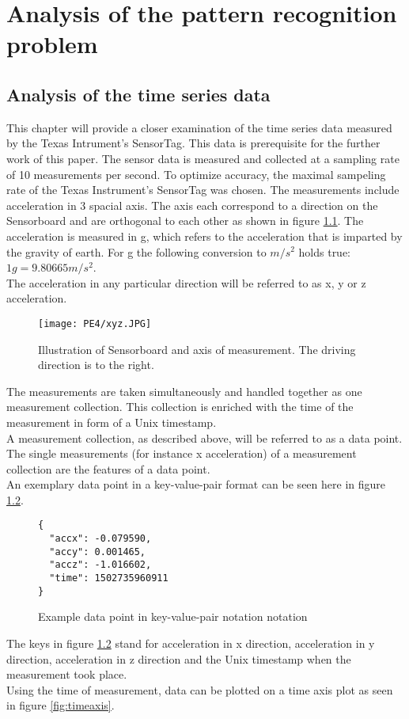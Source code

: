 \chapter{Analysis of the pattern recognition problem}
\label{ch:Analysis of the pattern recognition problem}

\section{Analysis of the time series data}
\label{sec:Analysis of the time series data}
This chapter will provide a closer examination of the time series data measured by the Texas Intrument's SensorTag. This data is prerequisite for the further work of this paper. \newline
The sensor data is measured and collected at a sampling rate of 10 measurements per second. To optimize accuracy, the maximal sampeling rate of the Texas Instrument's SensorTag was chosen.  The measurements include acceleration in 3 spacial axis. The axis each correspond to a direction on the Sensorboard and are orthogonal to each other as shown in figure \ref{fig:xyzboard}. The acceleration is measured in g, which refers to the acceleration that is imparted by the gravity of earth. For g the following conversion to  $m/s^2 $ holds true: $ 1 g = 9.80665 m/s^2 $. 
\\
The acceleration in any particular direction will be referred to as x, y or z acceleration.\cite{techdocu}

\begin{figure}[h]
\centering
\texttt{[image: PE4/xyz.JPG]}
\caption{Illustration of Sensorboard and axis of measurement. The driving direction is to the right.}
\label{fig:xyzboard}
\end{figure}


The measurements are taken  simultaneously and handled together as one measurement collection. This collection is enriched with the time of the measurement  in form of a Unix timestamp.\\
A measurement collection, as described above, will be referred to as a data point. The single measurements (for instance x acceleration) of a measurement collection are the features of a data point.\\
An exemplary data point in a key-value-pair format can be seen here in figure \ref{fig:datapointjson}.
\begin{figure}[h]
\centering
\begin{lstlisting}
{
  "accx": -0.079590,
  "accy": 0.001465,
  "accz": -1.016602,
  "time": 1502735960911
}
\end{lstlisting}
\caption{Example data point in key-value-pair notation notation}
\label{fig:datapointjson}
\end{figure}
The keys in figure \ref{fig:datapointjson} stand for acceleration in x direction, acceleration in y direction, acceleration in z direction and the Unix timestamp when the measurement took place. \\
Using the time of measurement, data can be plotted on a time axis plot as seen in figure \ref{fig:timeaxis}.


